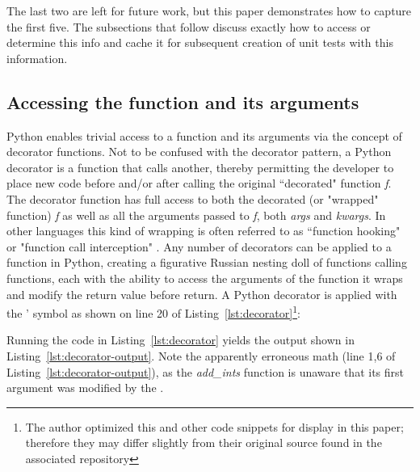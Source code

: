 \documentclass[10pt, conference]{IEEEtran}
\begin{document}
The last two are left for future work, but this paper demonstrates how to capture 
the first five. The subsections that follow discuss exactly how to 
access or determine this info and cache it for subsequent creation of unit tests
with this information.
\subsection{Accessing the function and its arguments}\label{sec:approach-internal-1}

Python enables trivial access to a function and 
its arguments via the concept of decorator functions. Not to be confused with 
the decorator pattern, a Python decorator is a 
function that calls another, thereby permitting the developer to place new code 
before and/or after calling the original “decorated" function \textit{f}.  
The decorator function has full access to both the decorated 
(or "wrapped" function) \textit{f} as well as all the 
arguments passed to \textit{f}, both \textit{args} and \textit{kwargs}.  In other 
languages this kind of wrapping is often referred to as 
“function hooking" or "function call interception" 
 \cite{kang2018function}. Any number of decorators can be applied to a function 
in Python, creating a figurative Russian nesting doll of
functions calling functions, each with the ability to access the 
arguments of the function it wraps and modify the 
return value before return. A Python decorator is applied with the \lq@\rq 
symbol as shown on line 20 of Listing~\ref{lst:decorator}\footnote{The author optimized this and other code snippets for display in 
this paper; therefore they may differ slightly from their original 
source found in the associated repository}:



Running the code in Listing~\ref{lst:decorator} yields the output shown in 
Listing~\ref{lst:decorator-output}. Note the apparently erroneous math (line 1,6 of 
Listing~\ref{lst:decorator-output}), as the \textit{add\_ints} function is 
unaware that its first argument was modified by the .

\lstset{style=batstyle}


\lstset{style=pythonstyle}
\end{document}
